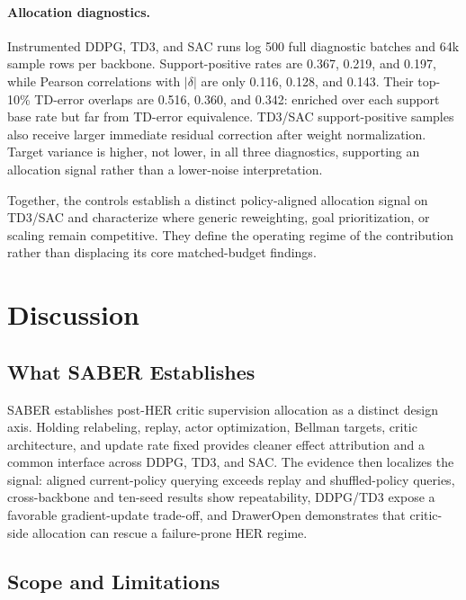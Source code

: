 \documentclass[letterpaper]{article}
\begin{document}
\paragraph{Allocation diagnostics.}
Instrumented DDPG, TD3, and SAC runs log 500 full diagnostic batches and 64k sample rows per backbone. Support-positive rates are 0.367, 0.219, and 0.197, while Pearson correlations with \(|\delta|\) are only 0.116, 0.128, and 0.143. Their top-10\% TD-error overlaps are 0.516, 0.360, and 0.342: enriched over each support base rate but far from TD-error equivalence. TD3/SAC support-positive samples also receive larger immediate residual correction after weight normalization. Target variance is higher, not lower, in all three diagnostics, supporting an allocation signal rather than a lower-noise interpretation.

Together, the controls establish a distinct policy-aligned allocation signal on TD3/SAC and characterize where generic reweighting, goal prioritization, or scaling remain competitive. They define the operating regime of the contribution rather than displacing its core matched-budget findings.

\section{Discussion}

\subsection{What SABER Establishes}

SABER establishes post-HER critic supervision allocation as a distinct design axis. Holding relabeling, replay, actor optimization, Bellman targets, critic architecture, and update rate fixed provides cleaner effect attribution and a common interface across DDPG, TD3, and SAC. The evidence then localizes the signal: aligned current-policy querying exceeds replay and shuffled-policy queries, cross-backbone and ten-seed results show repeatability, DDPG/TD3 expose a favorable gradient-update trade-off, and DrawerOpen demonstrates that critic-side allocation can rescue a failure-prone HER regime.

\subsection{Scope and Limitations}
\end{document}
